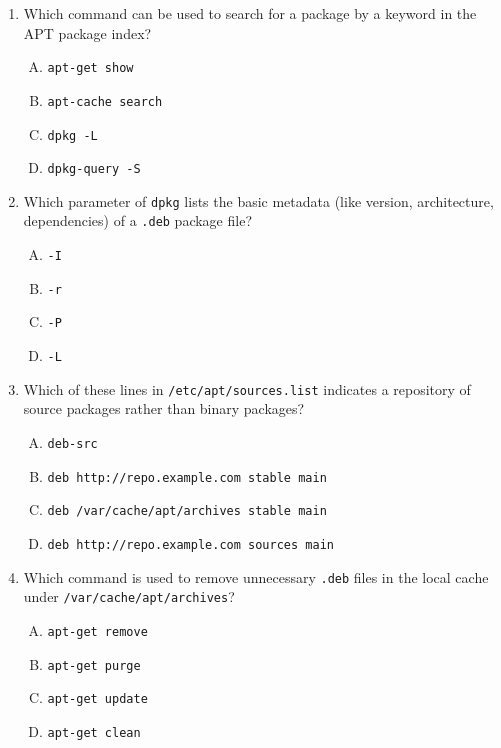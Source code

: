 \documentclass[a4paper]{report}
\begin{document}
\begin{enumerate}[1.]
    \item Which command can be used to search for a package by a keyword in the APT package index?  
    \begin{enumerate}[A)]
        \item \texttt{apt-get show}  
        \item \texttt{apt-cache search}  
        \item \texttt{dpkg -L}  
        \item \texttt{dpkg-query -S}  
    \end{enumerate}

    \item Which parameter of \texttt{dpkg} lists the basic metadata (like version, architecture, dependencies) of a \texttt{.deb} package file?  
    \begin{enumerate}[A)]
        \item \texttt{-I}  
        \item \texttt{-r}  
        \item \texttt{-P}  
        \item \texttt{-L}  
    \end{enumerate}

    \item Which of these lines in \texttt{/etc/apt/sources.list} indicates a repository of source packages rather than binary packages?  
    \begin{enumerate}[A)]
        \item \texttt{deb-src}  
        \item \texttt{deb http://repo.example.com stable main}  
        \item \texttt{deb /var/cache/apt/archives stable main}  
        \item \texttt{deb http://repo.example.com sources main}  
    \end{enumerate}

    \item Which command is used to remove unnecessary \texttt{.deb} files in the local cache under \texttt{/var/cache/apt/archives}?  
    \begin{enumerate}[A)]
        \item \texttt{apt-get remove}  
        \item \texttt{apt-get purge}  
        \item \texttt{apt-get update}  
        \item \texttt{apt-get clean}  
    \end{enumerate}


\end{enumerate}
\end{document}
